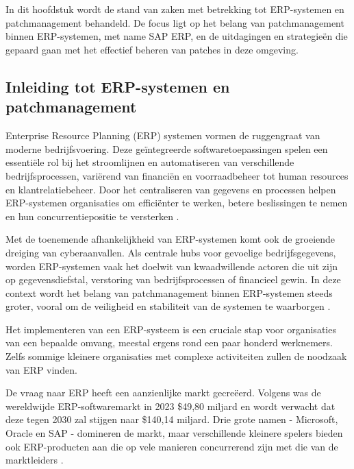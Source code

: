 \chapter{}
\label{ch:stand-van-zaken}


In dit hoofdstuk wordt de stand van zaken met betrekking tot ERP-systemen en patchmanagement behandeld. De focus ligt op het belang van patchmanagement binnen ERP-systemen, met name SAP ERP, en de uitdagingen en strategieën die gepaard gaan met het effectief beheren van patches in deze omgeving.

\section{Inleiding tot ERP-systemen en patchmanagement}
Enterprise Resource Planning (ERP) systemen vormen de ruggengraat van moderne bedrijfsvoering. Deze geïntegreerde softwaretoepassingen spelen een essentiële rol bij het stroomlijnen en automatiseren van verschillende bedrijfsprocessen, variërend van financiën en voorraadbeheer tot human resources en klantrelatiebeheer. Door het centraliseren van gegevens en processen helpen ERP-systemen organisaties om efficiënter te werken, betere beslissingen te nemen en hun concurrentiepositie te versterken \autocite{StatistiekVlaanderen2022}.

Met de toenemende afhankelijkheid van ERP-systemen komt ook de groeiende dreiging van cyberaanvallen. Als centrale hubs voor gevoelige bedrijfsgegevens, worden ERP-systemen vaak het doelwit van kwaadwillende actoren die uit zijn op gegevensdiefstal, verstoring van bedrijfsprocessen of financieel gewin. In deze context wordt het belang van patchmanagement binnen ERP-systemen steeds groter, vooral om de veiligheid en stabiliteit van de systemen te waarborgen \autocite{Pearson2024}.

Het implementeren van een ERP-systeem is een cruciale stap voor organisaties van een bepaalde omvang, meestal ergens rond een paar honderd werknemers. Zelfs sommige kleinere organisaties met complexe activiteiten zullen de noodzaak van ERP vinden.

De vraag naar ERP heeft een aanzienlijke markt gecreëerd. Volgens \textcite{Madh2024} was de wereldwijde ERP-softwaremarkt in 2023 \$49,80 miljard en wordt verwacht dat deze tegen 2030 zal stijgen naar \$140,14 miljard. Drie grote namen - Microsoft, Oracle en SAP - domineren de markt, maar verschillende kleinere spelers bieden ook ERP-producten aan die op vele manieren concurrerend zijn met die van de marktleiders \autocite{Pratt2023}.

